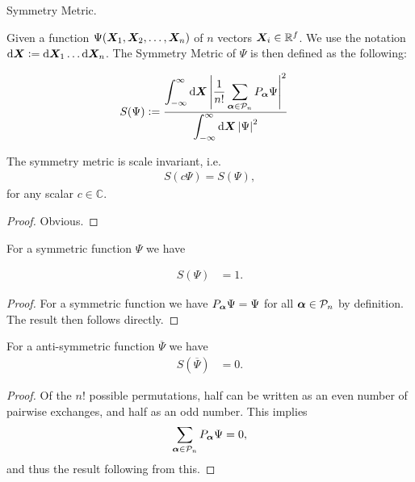 \documentclass[Thesis.tex]{subfiles}
\begin{document}
\begin{definition}{Symmetry Metric.}

    Given a function $\Psi(\bm{X}_1, \bm{X}_2,\dots,\bm{X}_n)$ of $n$ vectors $\bm{X}_i\in \mathbb{R}^f$. We use the notation $\dd{\bm{X}}\vcentcolon= \dd{\bm{X}_1}\dots\dd{\bm{X}_n}$.
    The Symmetry Metric of $\Psi$ is then defined as the following:

    \begin{align}\label{eq:symmetry-metric-def}
        S(\Psi) &\vcentcolon=  \frac{\displaystyle \int_{-\infty}^{\infty} \dd{\bm{X}}\abs{\frac{1}{n!}
        \sum_{\bm{\alpha}\in \mathcal{P}_n} P_{\bm{\alpha}}\Psi}^2}{\displaystyle \int_{-\infty}^{\infty}\dd{\bm{X}} \abs{\Psi}^2}
    \end{align}
\end{definition}
\begin{corollary}
   The symmetry metric is scale invariant, i.e.
    \begin{align}
        S(c\Psi) = S(\Psi),
    \end{align}
    for any scalar $c\in \mathbb{C}$.
\end{corollary}
\begin{proof}
   Obvious.
\end{proof}
\begin{corollary}
    For a symmetric function $\Psi$ we have

    \begin{align}
        S(\Psi) &= 1.
    \end{align}
\end{corollary}
\begin{proof}
    For a symmetric function we have $P_{\bm{\alpha}}\Psi=\Psi$ for all
    $\bm{\alpha}\in\mathcal{P}_n$ by definition. The result then follows directly.\end{proof}
\begin{corollary}
    For a anti-symmetric function $\overline\Psi$ we have
    \begin{align}
        S(\overline\Psi)&=0.
    \end{align}
\end{corollary}
\begin{proof}
   Of the $n!$ possible permutations, half can be written as an even number of
    pairwise exchanges, and half as an odd number. This implies
    \begin{align}
        \sum_{\bm{\alpha}\in \mathcal{P}_n} P_{\bm{\alpha}}\Psi = 0,
    \end{align}
    and thus the result following from this.
\end{proof}
\end{document}
